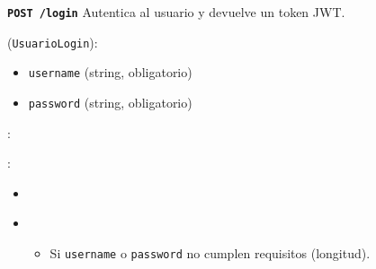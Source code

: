 \documentclass[a4paper,11pt,spanish]{sphinxmanual}
\newcommand{\robotoMonoBold}{\fontseries{b}\selectfont\ttfamily}
\renewcommand{\sphinxcode}[1]{\textcolor{sphinxorangeCode}{{\robotoMonoBold #1}}}
\renewcommand{\sphinxbfcode}[1]{\textbf{\sphinxcode{#1}}}
\renewcommand{\sphinxupquote}[1]{\texttt{#1}}
\begin{document}
\begin{fulllineitems}
\label{\detokenize{endpoints:post--login}}
\pysigstartsignatures
\pysigline
{\sphinxbfcode{\sphinxupquote{POST~}}\sphinxbfcode{\sphinxupquote{/login}}}
\pysigstopsignatures
\sphinxAtStartPar
Autentica al usuario y devuelve un token JWT.

\sphinxAtStartPar
{} (\sphinxcode{\sphinxupquote{UsuarioLogin}}):
\begin{itemize}
\item {} 
\sphinxAtStartPar
\sphinxcode{\sphinxupquote{username}} (string, obligatorio)

\item {} 
\sphinxAtStartPar
\sphinxcode{\sphinxupquote{password}} (string, obligatorio)

\end{itemize}

\sphinxAtStartPar
{}:

\begin{sphinxVerbatim}[commandchars=\\\{\}]
  
 
 

\end{sphinxVerbatim}

\sphinxAtStartPar
{}:
\begin{itemize}
\item {} 
\sphinxAtStartPar
{}

\begin{sphinxVerbatim}[commandchars=\\\{\}]
\end{sphinxVerbatim}

\item {} 
\sphinxAtStartPar
{}
\begin{itemize}
\item {} 
\sphinxAtStartPar
Si \sphinxcode{\sphinxupquote{username}} o \sphinxcode{\sphinxupquote{password}} no cumplen requisitos (longitud).


\end{itemize}
\end{itemize}
\end{fulllineitems}
\end{document}
